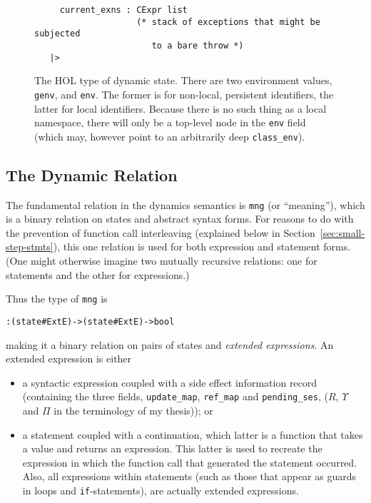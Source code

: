 \documentclass[11pt]{article}
\begin{document}
\begin{figure}[htbp]
\begin{verbatim}
     current_exns : CExpr list
                    (* stack of exceptions that might be subjected
                       to a bare throw *)
   |>
\end{verbatim}
\caption[The HOL Type of Dynamic State]{The HOL type of dynamic state.
  There are two environment values, \texttt{genv}, and \texttt{env}.
  The former is for non-local, persistent identifiers, the latter for
  local identifiers.  Because there is no such thing as a local
  namespace, there will only be a top-level node in the \texttt{env}
  field (which may, however point to an arbitrarily deep
  \texttt{class_env}).}
\label{fig:state-type}
\end{figure}

\subsection{The Dynamic Relation}

\newcommand{\mng}{\texttt{mng}}

The fundamental relation in the dynamics semantics is \mng{} (or
``meaning''), which is a binary relation on states and abstract syntax
forms.  For reasons to do with the prevention of function call
interleaving (explained below in Section~\ref{sec:small-step-stmts}),
this one relation is used for both expression and statement forms.
(One might otherwise imagine two mutually recursive relations: one for
statements and the other for expressions.)

Thus the type of \mng{} is
\begin{alltt}
   : (state # ExtE) -> (state # ExtE) -> bool
\end{alltt}
making it a binary relation on pairs of states and \emph{extended
  expressions}.  An extended expression is either
\begin{itemize}
\item a syntactic expression coupled with a side effect information
  record %
  (containing the three fields, \texttt{update\_map},
  \texttt{ref\_map} and \texttt{pending\_ses}, ($R$, $\Upsilon$ and
  $\Pi$ in the terminology of my thesis)); or
\item a statement coupled with a continuation, which latter is a
  function that takes a value and returns an expression.  This latter
  is used to recreate the expression in which the function call
  that generated the statement occurred.  Also, all expressions within
  statements (such as those that appear as guards in loops and
  \texttt{if}-statements), are actually extended expressions.
\end{itemize}
\end{document}
